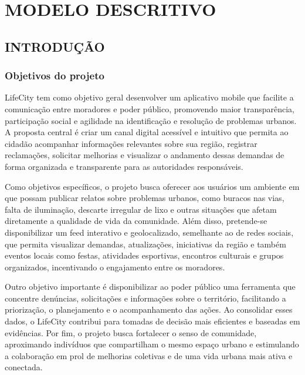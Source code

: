 
\section{MODELO DESCRITIVO}

\subsection{INTRODUÇÃO}

\subsubsection{Objetivos do projeto}

LifeCity tem como objetivo geral desenvolver um aplicativo mobile que facilite a
comunicação entre moradores e poder público, promovendo maior transparência,
participação social e agilidade na identificação e resolução de problemas urbanos.
A proposta central é criar um canal digital acessível e intuitivo que permita ao
cidadão acompanhar informações relevantes sobre sua região, registrar reclamações,
solicitar melhorias e visualizar o andamento dessas demandas de forma organizada
e transparente para as autoridades responsáveis.

Como objetivos específicos, o projeto busca oferecer aos usuários um ambiente em
que possam publicar relatos sobre problemas urbanos, como buracos nas vias, falta
de iluminação, descarte irregular de lixo e outras situações que afetam diretamente
a qualidade de vida da comunidade. Além disso, pretende-se disponibilizar um feed
interativo e geolocalizado, semelhante ao de redes sociais, que permita visualizar
demandas, atualizações, iniciativas da região e também eventos locais como festas,
atividades esportivas, encontros culturais e grupos organizados, incentivando o
engajamento entre os moradores.

Outro objetivo importante é disponibilizar ao poder público uma ferramenta que
concentre denúncias, solicitações e informações sobre o território, facilitando a
priorização, o planejamento e o acompanhamento das ações. Ao consolidar esses
dados, o LifeCity contribui para tomadas de decisão mais eficientes e baseadas em
evidências. Por fim, o projeto busca fortalecer o senso de comunidade, aproximando
indivíduos que compartilham o mesmo espaço urbano e estimulando a colaboração
em prol de melhorias coletivas e de uma vida urbana mais ativa e conectada.

